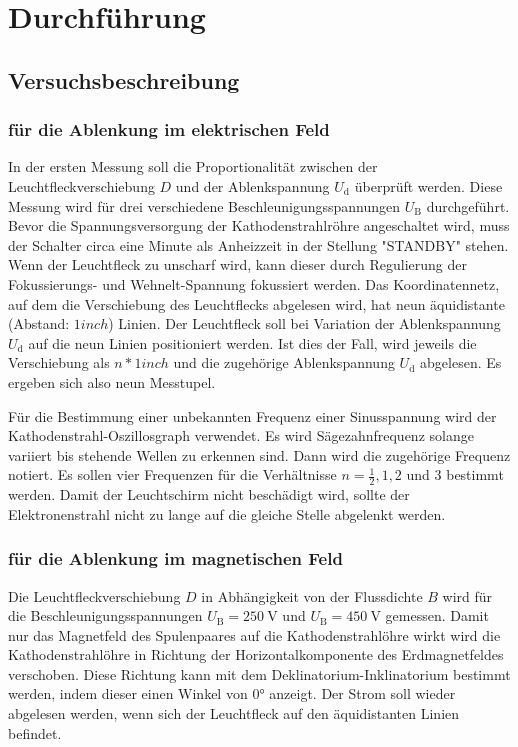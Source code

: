 \section{Durchführung}
\label{sec:Durchführung}



\subsection{Versuchsbeschreibung}
\subsubsection{für die Ablenkung im elektrischen Feld}
In der ersten Messung soll die Proportionalität zwischen der Leuchtfleckverschiebung $D$ und der 
Ablenkspannung $U_{\mathrm{d}}$ überprüft werden. Diese Messung wird für drei verschiedene 
Beschleunigungsspannungen $U_{\mathrm{B}}$ durchgeführt.
Bevor die Spannungsversorgung der Kathodenstrahlröhre angeschaltet wird, muss der Schalter 
circa eine Minute als Anheizzeit in der Stellung "STANDBY" stehen. Wenn der Leuchtfleck
zu unscharf wird, kann dieser durch Regulierung der Fokussierungs- und 
Wehnelt-Spannung fokussiert werden.
Das Koordinatennetz, auf dem die Verschiebung des Leuchtflecks abgelesen wird, hat neun 
äquidistante (Abstand: $1 inch$) Linien. Der Leuchtfleck soll bei Variation der 
Ablenkspannung $U_{\mathrm{d}}$ auf die neun Linien positioniert werden. Ist dies der Fall,
wird jeweils die Verschiebung als $n*1inch$ und die zugehörige Ablenkspannung 
$U_{\mathrm{d}}$ abgelesen. Es ergeben sich also neun Messtupel.

Für die Bestimmung einer unbekannten Frequenz einer Sinusspannung wird der 
Kathodenstrahl-Oszillosgraph verwendet. Es wird Sägezahnfrequenz solange variiert bis 
stehende Wellen zu erkennen sind. Dann wird die zugehörige Frequenz notiert. 
Es sollen vier Frequenzen für die Verhältnisse $n = \frac{1}{2}, 1, 2$ und $3$ bestimmt werden.
Damit der Leuchtschirm nicht beschädigt wird, sollte der Elektronenstrahl nicht zu lange auf 
die gleiche Stelle abgelenkt werden.

\subsubsection{für die Ablenkung im magnetischen Feld}
Die Leuchtfleckverschiebung $D$ in Abhängigkeit von der Flussdichte $B$ wird für die 
Beschleunigungsspannungen $U_{\mathrm{B}}=\SI{250}{\volt}$ und $U_{\mathrm{B}}=\SI{450}{\volt}$
gemessen. Damit nur das Magnetfeld des Spulenpaares auf die Kathodenstrahlöhre wirkt
wird die Kathodenstrahlöhre in Richtung der Horizontalkomponente des Erdmagnetfeldes verschoben.
Diese Richtung kann mit dem Deklinatorium-Inklinatorium bestimmt werden, indem dieser einen 
Winkel von $0°$ anzeigt. Der Strom soll wieder abgelesen werden, wenn sich der 
Leuchtfleck auf den äquidistanten Linien befindet.

